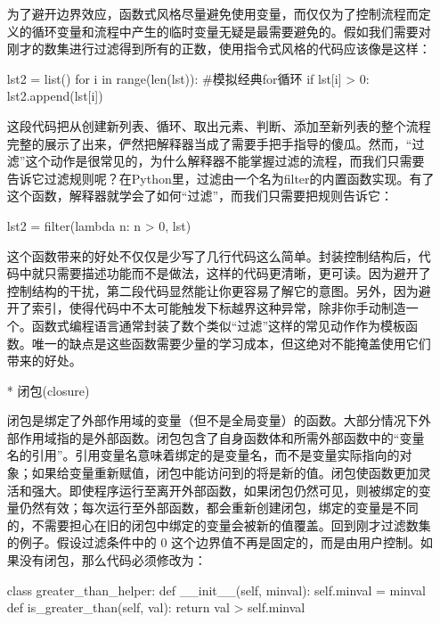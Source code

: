 \documentclass[12pt,a4paper]{report}
\begin{document}
\begin{enumerate}
    为了避开边界效应，函数式风格尽量避免使用变量，而仅仅为了控制流程而定义的循环变量和流程中产生的临时变量无疑是最需要避免的。假如我们需要对刚才的数集进行过滤得到所有的正数，使用指令式风格的代码应该像是这样： 
    \begin{python}[moreemph={[4]42},caption={},label=ex1]
lst2 = list()
for i in range(len(lst)): #模拟经典for循环
    if lst[i] > 0:
    lst2.append(lst[i])
    \end{python}
    这段代码把从创建新列表、循环、取出元素、判断、添加至新列表的整个流程完整的展示了出来，俨然把解释器当成了需要手把手指导的傻瓜。然而，“过滤”这个动作是很常见的，为什么解释器不能掌握过滤的流程，而我们只需要告诉它过滤规则呢？在Python里，过滤由一个名为filter的内置函数实现。有了这个函数，解释器就学会了如何“过滤”，而我们只需要把规则告诉它： 
    \begin{python}[moreemph={[4]42},caption={},label=ex1]
lst2 = filter(lambda n: n > 0, lst)
    \end{python}
    这个函数带来的好处不仅仅是少写了几行代码这么简单。封装控制结构后，代码中就只需要描述功能而不是做法，这样的代码更清晰，更可读。因为避开了控制结构的干扰，第二段代码显然能让你更容易了解它的意图。另外，因为避开了索引，使得代码中不太可能触发下标越界这种异常，除非你手动制造一个。函数式编程语言通常封装了数个类似“过滤”这样的常见动作作为模板函数。唯一的缺点是这些函数需要少量的学习成本，但这绝对不能掩盖使用它们带来的好处。
\item[*]闭包(closure)

    闭包是绑定了外部作用域的变量（但不是全局变量）的函数。大部分情况下外部作用域指的是外部函数。闭包包含了自身函数体和所需外部函数中的“变量名的引用”。引用变量名意味着绑定的是变量名，而不是变量实际指向的对象；如果给变量重新赋值，闭包中能访问到的将是新的值。闭包使函数更加灵活和强大。即使程序运行至离开外部函数，如果闭包仍然可见，则被绑定的变量仍然有效；每次运行至外部函数，都会重新创建闭包，绑定的变量是不同的，不需要担心在旧的闭包中绑定的变量会被新的值覆盖。回到刚才过滤数集的例子。假设过滤条件中的 0 这个边界值不再是固定的，而是由用户控制。如果没有闭包，那么代码必须修改为： 
    \begin{python}[moreemph={[4]42},caption={},label=ex1]
class greater_than_helper:
    def __init__(self, minval):
        self.minval = minval
    def is_greater_than(self, val):
        return val > self.minval
 

\end{python}
\end{enumerate}
\end{document}
